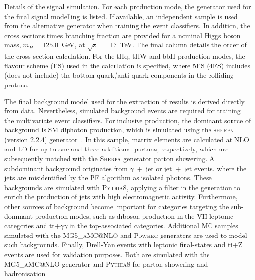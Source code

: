 \begin{table}[htb!]
    \caption[Signal simulation details]{Details of the signal simulation. For each production mode, the generator used for the final signal modelling is listed. If available, an independent sample is used from the alternative generator when training the event classifiers. In addition, the cross sections times branching fraction are provided for a nominal Higgs boson mass, $m_H=125.0$~GeV, at $\sqrt{s}~=~13$~TeV. The final column details the order of the cross section calculation. For the tHq, tHW and bbH production modes, the flavour scheme (FS) used in the calculation is specified, where 5FS (4FS) includes (does not include) the bottom quark/anti-quark components in the colliding protons.}
    \label{tab:signal_samples}
    \centering
    \scriptsize
    \hspace*{-5cm}
    \renewcommand{\arraystretch}{2}
    \setlength{\tabcolsep}{5pt}
    
    \hspace*{-5cm}
\end{table}

The final background model used for the extraction of results is derived directly from data. Nevertheless, simulated background events are required for training the multivariate event classifiers. For inclusive production, the dominant source of background is SM diphoton production, which is simulated using the \textsc{sherpa} (version 2.2.4) generator~\cite{Gleisberg:2008ta}. In this sample, matrix elements are calculated at NLO and LO for up to one and three additional partons, respectively, which are subsequently matched with the \textsc{Sherpa} generator parton showering. A subdominant background originates from $\gamma$~+~jet or jet~+~jet events, where the jets are misidentified by the PF algorithm as isolated photons. These backgrounds are simulated with \textsc{Pythia8}, applying a filter in the generation to enrich the production of jets with high electromagnetic activity. Furthermore, other sources of background become important for categories targeting the sub-dominant production modes, such as diboson production in the VH leptonic categories and tt+$\gamma\gamma$ in the top-associated categories. Additional MC samples simulated with the \textsc{MG5\_aMC@NLO} and \textsc{Powheg} generators are used to model such backgrounds. Finally, Drell-Yan events with leptonic final-states and tt+Z events are used for validation purposes. Both are simulated with the \textsc{MG5\_aMC@NLO} generator and \textsc{Pythia8} for parton showering and hadronisation.

